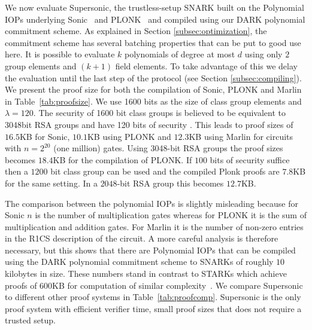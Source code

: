 We now evaluate \textsf{Supersonic}, the trustless-setup SNARK built on the Polynomial IOPs underlying \textsf{Sonic}~\cite{Sonic} and \textsf{PLONK}~\cite{Plonk} and compiled using our DARK polynomial commitment scheme. As explained in Section \ref{subsec:optimization}, the commitment scheme has several batching properties that can be put to good use here. It is possible to evaluate $k$ polynomials of degree at most $d$ using only $2$ group elements and $(k+1)$ field elements. To take advantage of this we delay the evaluation until the last step of the protocol (see Section \ref{subsec:compiling}). We present the proof size for both the compilation of \textsf{Sonic}, \textsf{PLONK} and \textsf{Marlin} in Table~\ref{tab:proofsize}. We use 1600 bits as the size of class group elements and $\lambda=120$. The security of 1600 bit class groups is believed to be equivalent to 3048bit RSA groups and have 120 bits of security \cite{PKC/BucHam01}. This leads to proof sizes of $16.5$KB for \textsf{Sonic}, $10.1$KB using \textsf{PLONK} and $12.3$KB using \textsf{Marlin} for circuits with $n = 2^{20}$ (one million) gates. Using 3048-bit RSA groups the proof sizes becomes $18.4$KB for the compilation of  \textsf{PLONK}. If $100$ bits of security suffice then a $1200$ bit class group can be used and the compiled Plonk proofs are $7.8$KB for the same setting. In a $2048$-bit RSA group this becomes $12.7$KB.

The comparison between the polynomial IOPs is slightly misleading because for \textsf{Sonic} $n$ is the number of multiplication gates whereas for \textsf{PLONK} it is the sum of multiplication and addition gates. For \textsf{Marlin} it is the number of non-zero entries in the R1CS description of the circuit. A more careful analysis is therefore necessary, but this shows that there are Polynomial IOPs that can be compiled using the DARK polynomial commitment scheme to SNARKs of roughly $10$ kilobytes in size. These numbers stand in contrast to \textsf{STARK}s which achieve proofs of $600$KB for computation of similar complexity~\cite{C:BBHR19}. We compare \textsf{Supersonic} to different other proof systems in Table~\ref{tab:proofcomp}. \textsf{Supersonic} is the only proof system with efficient verifier time, small proof sizes that does not require a trusted setup.


